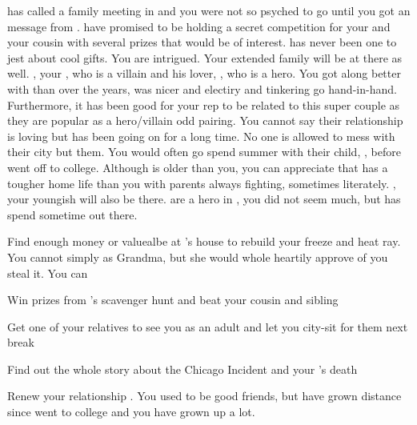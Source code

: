 \documentclass[char]{LRSguildcamp1}
\begin{document}
\cGrandma{} has called a family meeting in \pCityGrandma{} and you were not so psyched to go until you got an message from \cGrandma{}. \cGrandma{\they} have promised to be holding a secret competition for your and your cousin with several prizes that would be of interest. \cGrandma{} has never been one to jest about cool gifts. You are intrigued.  Your extended family will be at there as well. \cOldest{}, your \cOldest{\uncle}, who is a villain and his lover, \cOS{}, who is a hero. 
You got along better with \cOS{} than \cOldest{} over the years, \cOS{\they} was nicer and electiry and tinkering go hand-in-hand. Furthermore, it has been good for your rep to be related to this super couple as they are popular as a hero/villain odd pairing. You cannot say their relationship is loving but has been going on for a long time. No one is allowed to mess with their city but them.  You would often go spend summer with their child, \cGrad{}, before \cGrad{\they} went off to college. Although \cGrad{} is older than you, you can appreciate that \cGrad{} has a tougher home life than you with parents always fighting, sometimes literately. \cYoungest{}, your youngish \cYoungest{\uncle} will also be there.  are a hero in \pCityYoungest{}, you did not seem \cYoungest{\them} much, but \cTween{} has spend sometime out there. 


 
\begin{itemz}[Goals]
	\item Find enough money or valuealbe at \cGrandma{}'s house to rebuild your freeze and heat ray. You cannot simply as Grandma, but she would whole heartily approve of you steal it.  You can 
	
		\item Win prizes from \cGrandma{}'s scavenger hunt and beat your cousin and sibling
		\item Get one of your relatives to see you as an adult and let you city-sit for them next break
		\item Find out the whole story about the Chicago Incident and your \cAS{\parent}'s death
		\item Renew your relationship \cGrad{}. You used to be good friends, but have grown distance since \cGrad{} went to college and you have grown up a lot.
\end{itemz}
\end{document}
